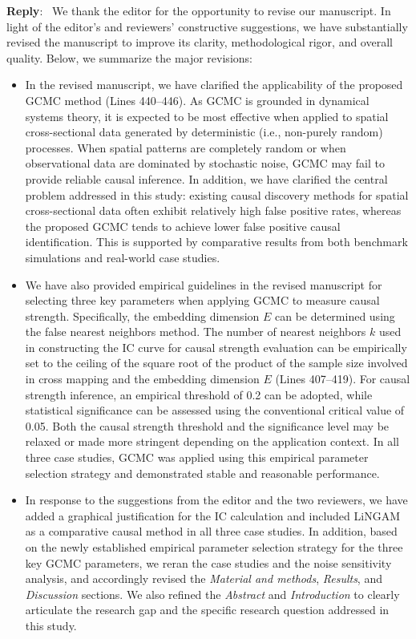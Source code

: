 \documentclass[11pt]{article}
\newcounter{reviewer}
\newenvironment{reply}
   {\medskip \noindent \color{blue} \begin{sf}\textbf{Reply}:\  }
   {\medskip \par \end{sf}}
\begin{document}
\begin{reply}
We thank the editor for the opportunity to revise our manuscript. In light of the editor’s and reviewers’ constructive suggestions, we have substantially revised the manuscript to improve its clarity, methodological rigor, and overall quality. Below, we summarize the major revisions:

\begin{itemize}
  \item In the revised manuscript, we have clarified the applicability of the proposed GCMC method (Lines 440--446). As GCMC is grounded in dynamical systems theory, it is expected to be most effective when applied to spatial cross-sectional data generated by deterministic (i.e., non-purely random) processes. When spatial patterns are completely random or when observational data are dominated by stochastic noise, GCMC may fail to provide reliable causal inference. In addition, we have clarified the central problem addressed in this study: existing causal discovery methods for spatial cross-sectional data often exhibit relatively high false positive rates, whereas the proposed GCMC tends to achieve lower false positive causal identification. This is supported by comparative results from both benchmark simulations and real-world case studies.
  
  \item We have also provided empirical guidelines in the revised manuscript for selecting three key parameters when applying GCMC to measure causal strength. Specifically, the embedding dimension $E$ can be determined using the false nearest neighbors method. The number of nearest neighbors $k$ used in constructing the IC curve for causal strength evaluation can be empirically set to the ceiling of the square root of the product of the sample size involved in cross mapping and the embedding dimension $E$ (Lines 407--419). For causal strength inference, an empirical threshold of 0.2 can be adopted, while statistical significance can be assessed using the conventional critical value of 0.05. Both the causal strength threshold and the significance level may be relaxed or made more stringent depending on the application context. In all three case studies, GCMC was applied using this empirical parameter selection strategy and demonstrated stable and reasonable performance.
  
  \item In response to the suggestions from the editor and the two reviewers, we have added a graphical justification for the IC calculation and included LiNGAM as a comparative causal method in all three case studies. In addition, based on the newly established empirical parameter selection strategy for the three key GCMC parameters, we reran the case studies and the noise sensitivity analysis, and accordingly revised the \textit{Material and methods}, \textit{Results}, and \textit{Discussion} sections. We also refined the \textit{Abstract} and \textit{Introduction} to clearly articulate the research gap and the specific research question addressed in this study.


\end{itemize}
\end{reply}
\end{document}

